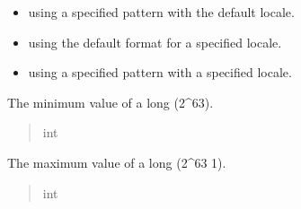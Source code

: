 \documentclass[letterpaper,10pt,english]{sphinxmanual}
\begin{document}
\begin{fulllineitems}
\begin{itemize}
\item {} 
\sphinxAtStartPar
using a specified pattern with the default locale.

\item {} 
\sphinxAtStartPar
using the default format for a specified locale.

\item {} 
\sphinxAtStartPar
using a specified pattern with a specified locale.

\end{itemize}

\begin{fulllineitems}
\label{\detokenize{apache_commons_validator_python.routines:apache_commons_validator_python.routines.long_validator.LongValidator.LONG_MIN}}
\pysigstartsignatures
{}
\pysigstopsignatures
\sphinxAtStartPar
The minimum value of a long (\sphinxhyphen{}2\textasciicircum{}63).
\begin{quote}\begin{description}
\sphinxAtStartPar
int

\end{description}\end{quote}

\end{fulllineitems}


\begin{fulllineitems}
\label{\detokenize{apache_commons_validator_python.routines:apache_commons_validator_python.routines.long_validator.LongValidator.LONG_MAX}}
\pysigstartsignatures
{}
\pysigstopsignatures
\sphinxAtStartPar
The maximum value of a long (2\textasciicircum{}63 \sphinxhyphen{} 1).
\begin{quote}\begin{description}
\sphinxAtStartPar
int

\end{description}\end{quote}


\end{fulllineitems}
\end{fulllineitems}
\end{document}
